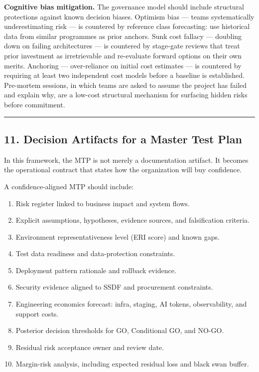 \documentclass[
]{article}
\providecommand{\tightlist}{%
  \setlength{\itemsep}{0pt}\setlength{\parskip}{0pt}}
\begin{document}
\textbf{Cognitive bias mitigation.} The governance model should include
structural protections against known decision biases. Optimism bias ---
teams systematically underestimating risk --- is countered by reference
class forecasting: use historical data from similar programmes as prior
anchors. Sunk cost fallacy --- doubling down on failing architectures
--- is countered by stage-gate reviews that treat prior investment as
irretrievable and re-evaluate forward options on their own merits.
Anchoring --- over-reliance on initial cost estimates --- is countered
by requiring at least two independent cost models before a baseline is
established. Pre-mortem sessions, in which teams are asked to assume the
project has failed and explain why, are a low-cost structural mechanism
for surfacing hidden risks before commitment.

\begin{center}\rule{0.5\linewidth}{0.5pt}\end{center}

\subsection{11. Decision Artifacts for a Master Test
Plan}\label{decision-artifacts-for-a-master-test-plan}

In this framework, the MTP is not merely a documentation artifact. It
becomes the operational contract that states how the organization will
buy confidence.

A confidence-aligned MTP should include:

\begin{enumerate}
\def\labelenumi{\arabic{enumi}.}
\tightlist
\item
  Risk register linked to business impact and system flows.
\item
  Explicit assumptions, hypotheses, evidence sources, and falsification
  criteria.
\item
  Environment representativeness level (ERI score) and known gaps.
\item
  Test data readiness and data-protection constraints.
\item
  Deployment pattern rationale and rollback evidence.
\item
  Security evidence aligned to SSDF and procurement constraints.
\item
  Engineering economics forecast: infra, staging, AI tokens,
  observability, and support costs.
\item
  Posterior decision thresholds for GO, Conditional GO, and NO-GO.
\item
  Residual risk acceptance owner and review date.
\item
  Margin-risk analysis, including expected residual loss and black swan
  buffer.
\end{enumerate}
\end{document}
